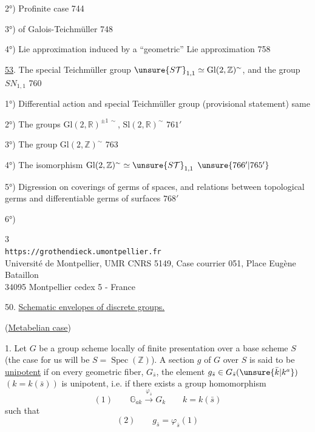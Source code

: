 2°) Profinite case \hfill 744

3°)  of Galois-Teichmüller \hfill 748

4°) Lie approximation induced by a ``geometric'' Lie approximation \hfill 758

\uline{53}. The special Teichmüller group $\unsure{S\mathcal T}_{1,1}\simeq\mathrm{Gl}(2,\mathbb Z)^{\sim}$, and the group $SN_{1,1}$ \hfill 760

1°) Differential action and special Teichmüller group (provisional statement) \hfill same

2°) The groups $\mathrm{Gl}(2,\mathbb R)^{\pm1\,\sim}$, $\mathrm{Sl}(2,\mathbb R)^{\sim}$ \hfill $761'$

3°) The group $\mathrm{Gl}(2,\mathbb Z)^{\sim}$ \hfill 763

4°) The isomorphism $\mathrm{Gl}(2,\mathbb Z)^{\sim}\simeq\unsure{S\mathcal T}_{1,1}$ \hfill $\unsure{766'|765'}$

5°) Digression on coverings of germs of spaces, and relations between topological germs and differentiable germs of surfaces \hfill $768'$

6°)



\begin{center}
\small
3\\
\texttt{https://grothendieck.umontpellier.fr}\\
Université de Montpellier, UMR CNRS 5149, Case courrier 051, Place Eugène Bataillon\\
34095 Montpellier cedex 5 - France
\end{center}


50. \uline{Schematic envelopes of discrete groups.}

(\uline{Metabelian case})

1. Let $G$ be a group scheme locally of finite presentation
over a base scheme $S$ (the case  for us will be
$S=\operatorname{Spec}(\mathbb Z)$). A section $g$ of $G$ over $S$ is said to be
\uline{unipotent} if on every geometric fiber,
 $G_{\bar s}$, the element
$g_{\bar s}\in G_{\bar s}(\unsure{\bar k|k^a})$
$(k=k(\bar s))$ is unipotent, i.e. if there exists a group homomorphism
\[
(1)\qquad \mathbb G_{ak}\xrightarrow{\varphi_{\bar s}}G_k
\qquad k=k(\bar s)
\]
such that
\[
(2)\qquad g_{\bar s}=\varphi_{\bar s}(1)
\]

